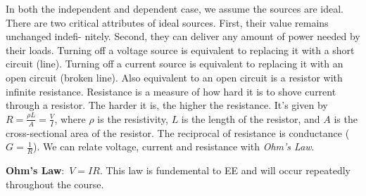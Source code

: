 \documentclass[nobib]{tufte-handout}
\newcommand{\defn}[2]{\noindent\textbf{#1}:\ #2}
\begin{document}
In both the independent and dependent case, we assume
the sources are ideal. There are two
critical attributes of ideal sources. First, their value remains unchanged indefi-
nitely. Second, they can deliver any amount of power needed by their loads.
Turning off a voltage source is equivalent to replacing it with a 
short circuit (line). Turning off a current source is equivalent to replacing it with an
open circuit (broken line). Also equivalent to an open
circuit is a resistor with infinite resistance. 
Resistance is a measure of how hard it is to shove current
through a resistor. The harder it is, the higher the
resistance. It's given by $R = \frac{\rho L}{A} = \frac{V}{I}$, where $\rho$ 
is the resistivity, $L$ is the length of the resistor, and $A$ is the 
cross-sectional area of the resistor. The reciprocal of
resistance is conductance ($G = \frac{1}{R}$). We can relate 
voltage, current and resistance with \emph{Ohm's Law}.

\defn{Ohm's Law}{$V = IR$.} This law is fundemental to EE and will
occur repeatedly throughout the course. 
\end{document}
